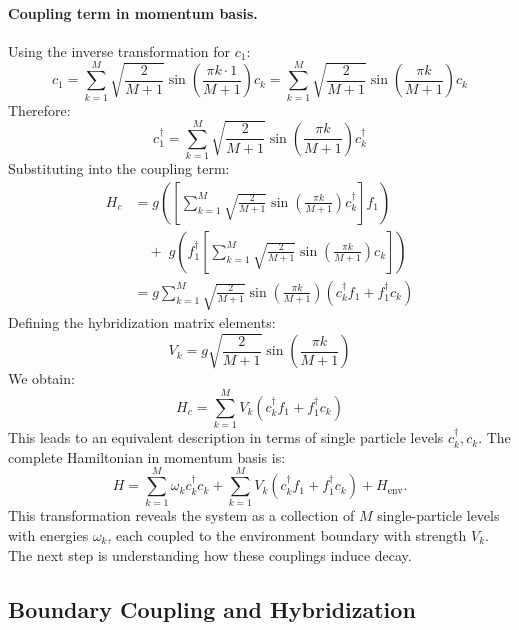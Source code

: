 \documentclass[12pt,oneside,openright]{report}
\theoremstyle{definition}
\theoremstyle{plain}
\theoremstyle{remark}
\begin{document}
\paragraph{Coupling term in momentum basis.}
Using the inverse transformation for $c_1$:
\begin{equation}
c_1 = \sum_{k=1}^M \sqrt{\frac{2}{M+1}} \sin\left(\frac{\pi k \cdot 1}{M+1}\right) c_k = \sum_{k=1}^M \sqrt{\frac{2}{M+1}} \sin\left(\frac{\pi k}{M+1}\right) c_k
\end{equation}
Therefore:
\begin{equation}
c_1^\dagger = \sum_{k=1}^M \sqrt{\frac{2}{M+1}} \sin\left(\frac{\pi k}{M+1}\right) c_k^\dagger
\end{equation}
Substituting into the coupling term:
\begin{align}
H_c &= g\left(\left[\sum_{k=1}^M \sqrt{\tfrac{2}{M+1}} \sin\left(\tfrac{\pi k}{M+1}\right) c_k^\dagger\right] f_1\right) \\
&\quad +\; g\left(f_1^\dagger \left[\sum_{k=1}^M \sqrt{\tfrac{2}{M+1}} \sin\left(\tfrac{\pi k}{M+1}\right) c_k\right]\right) \\
&= g \sum_{k=1}^M \sqrt{\tfrac{2}{M+1}} \sin\left(\tfrac{\pi k}{M+1}\right) \left(c_k^\dagger f_1 + f_1^\dagger c_k\right)
\end{align}
Defining the hybridization matrix elements:
\begin{equation}
V_k = g\sqrt{\frac{2}{M+1}} \sin\left(\frac{\pi k}{M+1}\right)
\end{equation}
We obtain:
\begin{equation}
H_c = \sum_{k=1}^M V_k \left(c_k^\dagger f_1 + f_1^\dagger c_k\right)
\end{equation}
This leads to an equivalent description in terms of single particle levels $ c_k^\dagger,c_k$.
The complete Hamiltonian in momentum basis is:
\begin{equation}
H = \sum_{k=1}^M \omega_k c_k^\dagger c_k + \sum_{k=1}^M V_k \left(c_k^\dagger f_1 + f_1^\dagger c_k\right) + H_{\text{env}}.
\label{eq:H_total_momentum}
\end{equation}
This transformation reveals the system as a collection of $M$ single-particle levels with energies $\omega_k$, 
each coupled to the environment boundary with strength $V_k$. The next step is understanding how these couplings induce decay.

\subsection{Boundary Coupling and Hybridization}
\label{subsec:boundary_dos}
\end{document}
